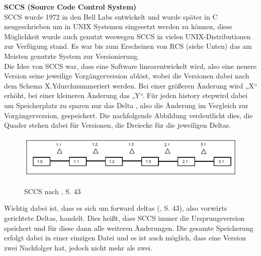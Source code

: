 \textbf{SCCS (Source Code Control System)}
\\
\acs{SCCS} wurde 1972 in den Bell Labs entwickelt und wurde später in C neugeschrieben um in UNIX Systemen eingesetzt werden zu können, diese Möglichkeit wurde auch genutzt weswegen SCCS in vielen UNIX-Distributionen zur Verfügung stand. Es war bis zum Erscheinen von RCS (siehe Unten) das am Meisten genutzte System zur Versionierung. 
\\
Die Idee von SCCS war, dass eine Software \Gu linear\Go entwickelt wird, also eine neuere Version seine jeweilige Vorgängerversion ablöst, wobei die Versionen dabei nach dem Schema \Gu X.Y\Go durchnummeriert werden. Bei einer größeren Änderung wird „X“ erhöht, bei einer kleineren Änderung das „Y“. Für jeden \Gu history step\Go wird dabei um Speicherplatz zu sparen nur das \Gu Delta \Go, also die Änderung im Vergleich zur Vorgängerversion, gespeichert. Die nachfolgende Abbildung verdeutlicht dies, die Quader stehen dabei für Versionen, die Dreiecke für die jeweiligen Deltas.
\begin{figure}[H]
	\includegraphics[width=\textwidth]{img/vcm1.png}
	\label{fig:vcm1}
	\caption{ SCCS nach \cite{cm_vc}, S. 43}
\end{figure}

Wichtig dabei ist, dass es sich um \Gu forward deltas \Go (\cite{cm_vc}, S. 43), also vorwärts gerichtete Deltas, handelt. Dies heißt, dass SCCS immer die Ursprungsversion speichert und für diese dann alle weiteren Änderungen. Die gesamte Speicherung erfolgt dabei in einer einzigen Datei und es ist auch möglich, dass eine Version zwei Nachfolger hat, jedoch nicht mehr als zwei.

